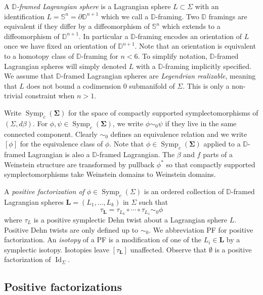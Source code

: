 \documentclass[11pt]{amsart}
\DeclareMathOperator{\Symp}{Symp}
\DeclareMathOperator{\Id}{Id}
\newcommand{\thicc}[1]{\pmb{#1}}
\newcommand{\disk}{\mathbb{D}}
\newcommand{\sphere}{\mathbb{S}}
\newcommand{\LagTuple}{\thicc{L}}
\begin{document}
A \emph{$\disk$-framed Lagrangian sphere} is a Lagrangian sphere $L \subset \Sigma$ with an identification $L = \sphere^{n} = \partial \disk^{n+1}$ which we call a $\disk$-framing. Two $\disk$ framings are equivalent if they differ by a diffeomorphism of $\sphere^{n}$ which extends to a diffeomorphism of $\disk^{n+1}$. In particular a $\disk$-framing encodes an orientation of $L$ once we have fixed an orientation of $\disk^{n+1}$. Note that an orientation is equivalent to a homotopy class of $\disk$-framing for $n < 6$. To simplify notation, $\disk$-framed Lagrangian spheres will simply denoted $L$ with a $\disk$-framing implicitly specified. We assume that $\disk$-framed Lagrangian spheres are \emph{Legendrian realizable}, meaning that $L$ does not bound a codimension $0$ submanifold of $\Sigma$. This is only a non-trivial constraint when $n > 1$.

Write $\Symp_{c}(\thicc{\Sigma})$ for the space of compactly supported symplectomorphisms of $(\Sigma, d\beta)$. For $\phi, \psi \in \Symp_{c}(\thicc{\Sigma})$, we write $\phi \sim_{0} \psi$ if they live in the same connected component. Clearly $\sim_{0}$ defines an equivalence relation and we write $[\phi]$ for the equivalence class of $\phi$. Note that $\phi \in \Symp_{c}(\thicc{\Sigma})$ applied to a $\disk$-framed Lagrangian is also a $\disk$-framed Lagrangian. The $\beta$ and $f$ parts of a Weinstein structure are transformed by pullback $\phi^{\ast}$ so that compactly supported symplectomorphisms take Weinstein domains to Weinstein domains.

A \emph{positive factorization of $\phi \in \Symp_{c}(\Sigma)$} is an ordered collection of $\disk$-framed Lagrangian spheres $\LagTuple = (L_{1}, \dots, L_{k})$ in $\Sigma$ such that
\begin{equation*}
\tau_{\LagTuple} = \tau_{L_{k}} \circ \cdots \circ \tau_{L_{1}} \sim_{0} \phi
\end{equation*}
where $\tau_{L}$ is a positive symplectic Dehn twist about a Lagrangian sphere $L$. Positive Dehn twists are only defined up to $\sim_{0}$. We abbreviation PF for positive factorization. An \emph{isotopy} of a PF is a modification of one of the $L_{i} \in \LagTuple$ by a symplectic isotopy. Isotopies leave $[\tau_{\LagTuple}]$ unaffected. Observe that $\emptyset$ is a positive factorization of $\Id_{\Sigma}$.

\subsection{Positive factorizations}
\end{document}
